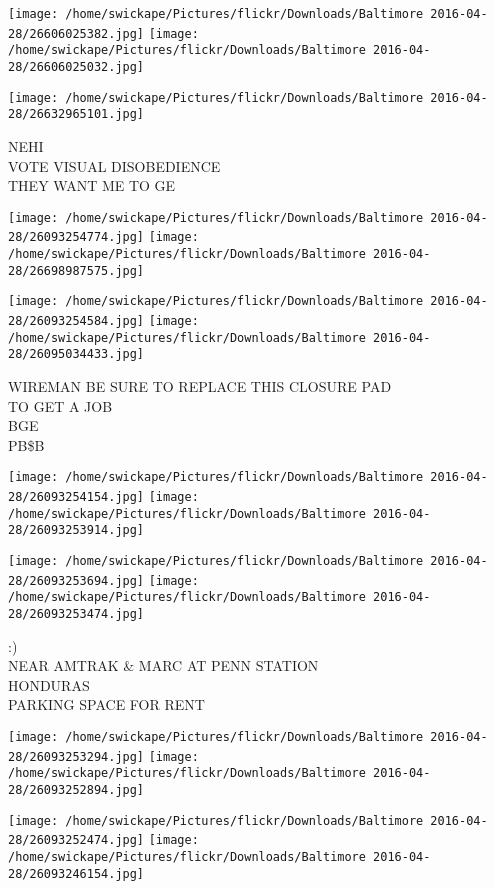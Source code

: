 \documentclass[10pt,letterpaper]{article}
\begin{document}
\texttt{[image: /home/swickape/Pictures/flickr/Downloads/Baltimore 2016-04-28/26606025382.jpg]}
\texttt{[image: /home/swickape/Pictures/flickr/Downloads/Baltimore 2016-04-28/26606025032.jpg]}

\vspace{0.25in}
\texttt{[image: /home/swickape/Pictures/flickr/Downloads/Baltimore 2016-04-28/26632965101.jpg]}

NEHI\\
VOTE VISUAL DISOBEDIENCE\\
THEY WANT ME TO GE
\pagebreak

\texttt{[image: /home/swickape/Pictures/flickr/Downloads/Baltimore 2016-04-28/26093254774.jpg]}
\texttt{[image: /home/swickape/Pictures/flickr/Downloads/Baltimore 2016-04-28/26698987575.jpg]}

\texttt{[image: /home/swickape/Pictures/flickr/Downloads/Baltimore 2016-04-28/26093254584.jpg]}
\texttt{[image: /home/swickape/Pictures/flickr/Downloads/Baltimore 2016-04-28/26095034433.jpg]}

WIREMAN BE SURE TO REPLACE THIS CLOSURE PAD\\
TO GET A JOB\\
BGE\\
PB\$B
\pagebreak

\texttt{[image: /home/swickape/Pictures/flickr/Downloads/Baltimore 2016-04-28/26093254154.jpg]}
\texttt{[image: /home/swickape/Pictures/flickr/Downloads/Baltimore 2016-04-28/26093253914.jpg]}

\texttt{[image: /home/swickape/Pictures/flickr/Downloads/Baltimore 2016-04-28/26093253694.jpg]}
\texttt{[image: /home/swickape/Pictures/flickr/Downloads/Baltimore 2016-04-28/26093253474.jpg]}

:)\\
NEAR AMTRAK \& MARC AT PENN STATION\\
HONDURAS\\
PARKING SPACE FOR RENT
\pagebreak

\texttt{[image: /home/swickape/Pictures/flickr/Downloads/Baltimore 2016-04-28/26093253294.jpg]}
\texttt{[image: /home/swickape/Pictures/flickr/Downloads/Baltimore 2016-04-28/26093252894.jpg]}

\texttt{[image: /home/swickape/Pictures/flickr/Downloads/Baltimore 2016-04-28/26093252474.jpg]}
\texttt{[image: /home/swickape/Pictures/flickr/Downloads/Baltimore 2016-04-28/26093246154.jpg]}
\end{document}
